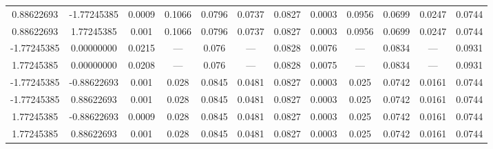 \documentclass[a4paper,14pt]{extarticle}
\begin{document}
\begin{landscape}
\begin{table}[H]
\begin{tabular}{|c|c|*{5}{c}|*{5}{c}|}
 0.88622693        & -1.77245385        & 0.0009 & 0.1066 & 0.0796 & 0.0737 & 0.0827 & 0.0003 & 0.0956 & 0.0699 & 0.0247 & 0.0744 \\
 0.88622693        &  1.77245385        & 0.001  & 0.1066 & 0.0796 & 0.0737 & 0.0827 & 0.0003 & 0.0956 & 0.0699 & 0.0247 & 0.0744 \\
-1.77245385        &  0.00000000        & 0.0215 & ---    & 0.076  & ---    & 0.0828 & 0.0076 & ---    & 0.0834 & ---    & 0.0931 \\
 1.77245385        &  0.00000000        & 0.0208 & ---    & 0.076  & ---    & 0.0828 & 0.0075 & ---    & 0.0834 & ---    & 0.0931 \\
-1.77245385        & -0.88622693        & 0.001  & 0.028  & 0.0845 & 0.0481 & 0.0827 & 0.0003 & 0.025  & 0.0742 & 0.0161 & 0.0744 \\
-1.77245385        &  0.88622693        & 0.001  & 0.028  & 0.0845 & 0.0481 & 0.0827 & 0.0003 & 0.025  & 0.0742 & 0.0161 & 0.0744 \\
 1.77245385        & -0.88622693        & 0.0009 & 0.028  & 0.0845 & 0.0481 & 0.0827 & 0.0003 & 0.025  & 0.0742 & 0.0161 & 0.0744 \\
 1.77245385        &  0.88622693        & 0.001  & 0.028  & 0.0845 & 0.0481 & 0.0827 & 0.0003 & 0.025  & 0.0742 & 0.0161 & 0.0744 \\
\hline
\end{tabular}
\end{table} 


\end{landscape}
\end{document}
